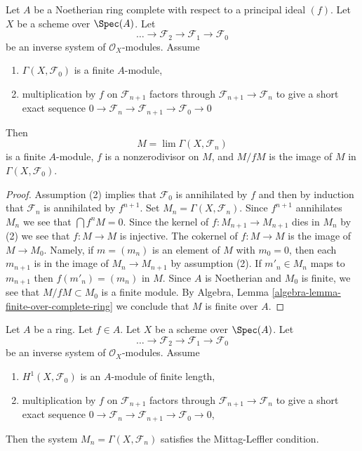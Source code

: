 \begin{lemma}
\label{lemma-limit-finite}
Let $A$ be a Noetherian ring complete with respect to a principal ideal $(f)$.
Let $X$ be a scheme over $\Spec(A)$. Let
$$
\ldots \to \mathcal{F}_2 \to \mathcal{F}_1 \to \mathcal{F}_0
$$
be an inverse system of $\mathcal{O}_X$-modules. Assume
\begin{enumerate}
\item $\Gamma(X, \mathcal{F}_0)$ is a finite $A$-module,
\item multiplication by $f$ on $\mathcal{F}_{n + 1}$ factors
through $\mathcal{F}_{n + 1} \to \mathcal{F}_n$ to give a
short exact sequence
$0 \to \mathcal{F}_n \to \mathcal{F}_{n + 1} \to \mathcal{F}_0 \to 0$
\end{enumerate}
Then
$$
M = \lim \Gamma(X, \mathcal{F}_n)
$$
is a finite $A$-module, $f$ is a nonzerodivisor on $M$, and
$M/fM$ is the image of $M$ in $\Gamma(X, \mathcal{F}_0)$.
\end{lemma}

\begin{proof}
Assumption (2) implies that $\mathcal{F}_0$ is annihilated by $f$
and then by induction that $\mathcal{F}_n$ is annihilated by $f^{n + 1}$.
Set $M_n = \Gamma(X, \mathcal{F}_n)$. Since $f^{n + 1}$ annihilates
$M_n$ we see that $\bigcap f^nM = 0$. Since the kernel of
$f : M_{n + 1} \to M_{n + 1}$ dies in $M_n$ by (2) we see that
$f : M \to M$ is injective. The cokernel of $f : M \to M$
is the image of $M \to M_0$. Namely, if $m = (m_n)$ is an element
of $M$ with $m_0 = 0$, then each $m_{n + 1}$ is in the image of
$M_n \to M_{n + 1}$ by assumption (2).
If $m'_n \in M_n$ maps to $m_{n + 1}$ then $f(m'_n) = (m_n)$ in $M$.
Since $A$ is Noetherian and $M_0$ is finite, we see that
$M/fM \subset M_0$ is a finite module. By
Algebra, Lemma \ref{algebra-lemma-finite-over-complete-ring}
we conclude that $M$ is finite over $A$.
\end{proof}

\begin{lemma}
\label{lemma-ML}
Let $A$ be a ring. Let $f \in A$. Let $X$ be a scheme over $\Spec(A)$. Let
$$
\ldots \to \mathcal{F}_2 \to \mathcal{F}_1 \to \mathcal{F}_0
$$
be an inverse system of $\mathcal{O}_X$-modules. Assume
\begin{enumerate}
\item $H^1(X, \mathcal{F}_0)$ is an $A$-module of finite length,
\item multiplication by $f$ on $\mathcal{F}_{n + 1}$ factors
through $\mathcal{F}_{n + 1} \to \mathcal{F}_n$ to give a
short exact sequence
$0 \to \mathcal{F}_n \to \mathcal{F}_{n + 1} \to \mathcal{F}_0 \to 0$,
\end{enumerate}
Then the system $M_n = \Gamma(X, \mathcal{F}_n)$ satisfies the
Mittag-Leffler condition.
\end{lemma}

